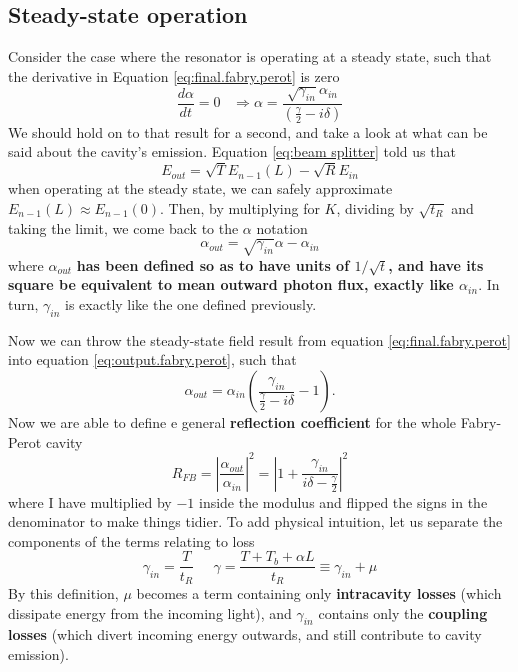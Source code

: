 \subsection*{Steady-state operation}
Consider the case where the resonator is operating at a steady state, such that the derivative in Equation \ref{eq:final.fabry.perot} is zero
\begin{equation}
    \frac{d\alpha}{dt}=0\;\;\;\Rightarrow \alpha=\frac{\sqrt{\gamma_{in}}\alpha_{in}}{\left(\frac{\gamma}{2}-i\delta\right)}
\end{equation}
We should hold on to that result for a second, and take a look at what can be said about the cavity's emission. Equation \ref{eq:beam splitter} told us that
\begin{equation}
    E_{out}=\sqrt{T}E_{n-1}(L)-\sqrt{R}E_{in}
\end{equation}
when operating at the steady state, we can safely approximate $E_{n-1}(L)\approx E_{n-1}(0)$. Then, by multiplying for $K$, dividing by $\sqrt{t_R}$ and taking the limit, we come back to the $\alpha$ notation
\begin{equation}
    \alpha_{out}=\sqrt{\gamma_{in}}\alpha-\alpha_{in}
    \label{eq:output.fabry.perot}
\end{equation}
where $\alpha_{out}$ \textbf{has been defined so as to have units of $1/\sqrt{t}$, and have its square be equivalent to mean outward photon flux, exactly like $\alpha_{in}$}. In turn, $\gamma_{in}$ is exactly like the one defined previously.

Now we can throw the steady-state field result from equation \ref{eq:final.fabry.perot} into equation \ref{eq:output.fabry.perot}, such that
\begin{equation}
    \alpha_{out}=\alpha_{in}\left(\frac{\gamma_{in}}{\frac{\gamma}{2}-i\delta}-1\right).
\end{equation}
Now we are able to define e general \textbf{reflection coefficient} for the whole Fabry-Perot cavity
\begin{equation}
    R_{FB}=\left|\frac{\alpha_{out}}{\alpha_{in}}\right|^2=\left|1+\frac{\gamma_{in}}{i\delta-\frac{\gamma}{2}}\right|^2
\end{equation}
where I have multiplied by $-1$ inside the modulus and flipped the signs in the denominator to make things tidier. To add physical intuition, let us separate the components of the terms relating to loss
\begin{equation}
    \gamma_{in}=\frac{T}{t_R}\;\;\;\;\;\gamma=\frac{T+T_b+\alpha L}{t_R}\equiv \gamma_{in}+\mu
\end{equation}
By this definition, $\mu$ becomes a term containing only \textbf{intracavity losses} (which dissipate energy from the incoming light), and $\gamma_{in}$ contains only the \textbf{coupling losses} (which divert incoming energy outwards, and still contribute to cavity emission).

